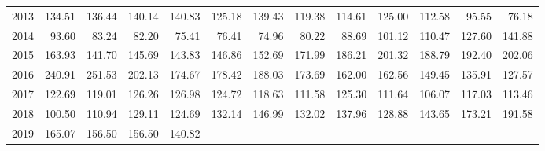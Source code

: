 \begin{longtable}{rrrrrrrrrrrrr}
  2013 & 134.51 & 136.44 & 140.14 & 140.83 & 125.18 & 139.43 & 119.38 & 114.61 & 125.00 & 112.58 & 95.55 & 76.18 \\ 
  2014 & 93.60 & 83.24 & 82.20 & 75.41 & 76.41 & 74.96 & 80.22 & 88.69 & 101.12 & 110.47 & 127.60 & 141.88 \\ 
  2015 & 163.93 & 141.70 & 145.69 & 143.83 & 146.86 & 152.69 & 171.99 & 186.21 & 201.32 & 188.79 & 192.40 & 202.06 \\ 
  2016 & 240.91 & 251.53 & 202.13 & 174.67 & 178.42 & 188.03 & 173.69 & 162.00 & 162.56 & 149.45 & 135.91 & 127.57 \\ 
  2017 & 122.69 & 119.01 & 126.26 & 126.98 & 124.72 & 118.63 & 111.58 & 125.30 & 111.64 & 106.07 & 117.03 & 113.46 \\ 
  2018 & 100.50 & 110.94 & 129.11 & 124.69 & 132.14 & 146.99 & 132.02 & 137.96 & 128.88 & 143.65 & 173.21 & 191.58 \\ 
  2019 & 165.07 & 156.50 & 156.50 & 140.82 &  &  &  &  &  &  &  &  \\ 
   \hline
\hline
\end{longtable}
